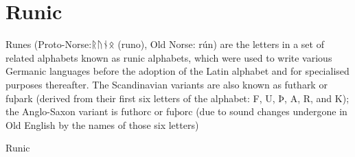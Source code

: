 \section{Runic}
\label{s:runic}
\newfontfamily{}

Runes (Proto-Norse:{\runic ᚱᚢᚾᛟ }(runo), Old Norse: rún) are the letters in a set of related alphabets known as runic alphabets, which were used to write various Germanic languages before the adoption of the Latin alphabet and for specialised purposes thereafter. The Scandinavian variants are also known as futhark or fuþark (derived from their first six letters of the alphabet: F, U, Þ, A, R, and K); the Anglo-Saxon variant is futhorc or fuþorc (due to sound changes undergone in Old English by the names of those six letters)

\begin{scriptexample}[]{Runic}
\end{scriptexample}


